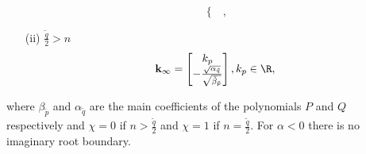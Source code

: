 \documentclass[twoside,reqno,11pt]{fcaa-var} %
\begin{document}
\begin{proposition}
\begin{itemize}
\begin{equation}
\begin{cases}
		\end{cases}, \label{eqIRBa}
		\end{equation}
		\item[(ii)] $\frac{\tilde{q}}{2}>n$ %
		\begin{equation}
		\mathbf{k}_\infty=\begin{bmatrix} k_p \\ -\tfrac{\sqrt{\alpha_{\tilde{q}}}}{\sqrt{\tilde{\beta}_{\tilde{p}}}} \end{bmatrix}, k_p\in\R, \label{eqIRBb}
		\end{equation}
	\end{itemize}
	where $\beta_{\tilde{p}}$ and $\alpha_{\tilde{q}}$ are the main coefficients of the polynomials $P$ and $Q$ respectively and $\chi=0$ if $n>\frac{\tilde{q}}{2}$ and $\chi=1$ if $n=\frac{\tilde{q}}{2}$. For $\alpha<0$ there is no imaginary root boundary.
\end{proposition}
\end{document}
